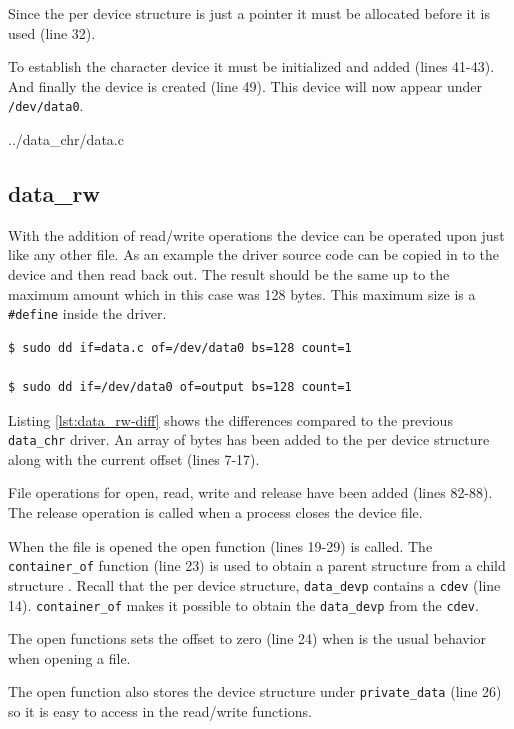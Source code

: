 \documentclass{article}
\begin{document}
Since the per device structure is just a pointer it must be
allocated before it is used (line 32).

To establish the character device it must be initialized and
added (lines 41-43).  And finally the device is created (line 49).
This device will now appear under \verb+/dev/data0+.

\pagebreak

	{../data_chr/data.c}



\subsection{data\_rw}
\label{sec:data_rw}

With the addition of read/write operations the device can be
operated upon just like any other file.
As an example the driver source code can be copied in to the
device and then read back out.
The result should be the same up to the maximum amount which
in this case was 128 bytes.
This maximum size is a \verb+#define+ inside the driver.

\begin{verbatim}
$ sudo dd if=data.c of=/dev/data0 bs=128 count=1

$ sudo dd if=/dev/data0 of=output bs=128 count=1
\end{verbatim}

Listing \ref{lst:data_rw-diff} shows the differences compared to the
previous \verb+data_chr+ driver.  An array of bytes has been added
to the per device structure along with the current offset (lines 7-17).

File operations for open, read, write and release have been added (lines 82-88).
The release operation is called when a process closes the device file.

When the file is opened the open function (lines 19-29) is called.
The \verb+container_of+ function (line 23) is used to obtain a parent
structure from a child structure\autocite[Pg. 79]{corbet2009linux}
\autocite{kroah2005cont}.
Recall that the per device structure, \verb+data_devp+ contains a
\verb+cdev+ (line 14).
\verb+container_of+ makes it possible to obtain the \verb+data_devp+
from the \verb+cdev+.

The open functions sets the offset to zero (line 24) when is the usual
behavior when opening a file.

The open function also stores the device structure under \verb+private_data+
(line 26) so it is easy to access in the read/write functions.
\end{document}
